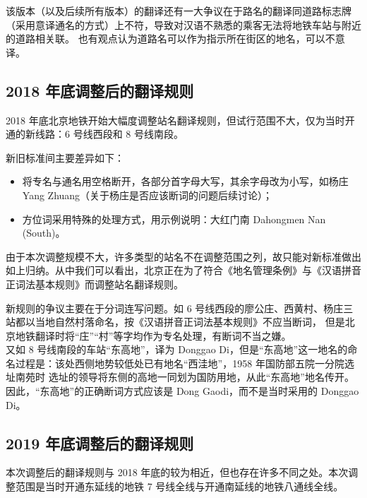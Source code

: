 \documentclass[a4paper,UTF8,12pt]{ctexart}
\begin{document}
        该版本（以及后续所有版本）的翻译还有一大争议在于路名的翻译同道路标志牌（采用意译通名的方式）上不符，导致对汉语不熟悉的乘客无法将地铁车站与附近的道路相关联。\cite{ref11} 也有观点认为道路名可以作为指示所在街区的地名，可以不意译。
    \subsection{2018 年底调整后的翻译规则}
        2018 年底北京地铁开始大幅度调整站名翻译规则，但试行范围不大，仅为当时开通的新线路：6 号线西段和 8 号线南段。

        新旧标准间主要差异如下：
        \begin{itemize}
            \item 将专名与通名用空格断开，各部分首字母大写，其余字母改为小写，如杨庄 Yang Zhuang（关于杨庄是否应该断词的问题后续讨论）；
            \item 方位词采用特殊的处理方式，用示例说明：大红门南 Dahongmen Nan (South)。
        \end{itemize}

        由于本次调整规模不大，许多类型的站名不在调整范围之列，故只能对新标准做出如上归纳。从中我们可以看出，北京正在为了符合《地名管理条例》与《汉语拼音正词法基本规则》而调整站名翻译规则。

        新规则的争议主要在于分词连写问题。如 6 号线西段的廖公庄、西黄村、杨庄三站都以当地自然村落命名，按《汉语拼音正词法基本规则》不应当断词，
        但是北京地铁翻译时将“庄”“村”等字均作为专名处理，有断词不当之嫌。\\
        又如 8 号线南段的车站“东高地”，译为 Donggao Di，但是“东高地”这一地名的命名过程是：该处西侧地势较低处已有地名“西洼地”，1958 年国防部五院一分院选址南苑时
        选址的领导将东侧的高地一同划为国防用地，从此“东高地”地名传开。\cite{ref12} 因此，“东高地”的正确断词方式应该是 Dong Gaodi，而不是当时采用的 Donggao Di。
    \subsection{2019 年底调整后的翻译规则}
        本次调整后的翻译规则与 2018 年底的较为相近，但也存在许多不同之处。本次调整范围是当时开通东延线的地铁 7 号线全线与开通南延线的地铁八通线全线。
\end{document}
